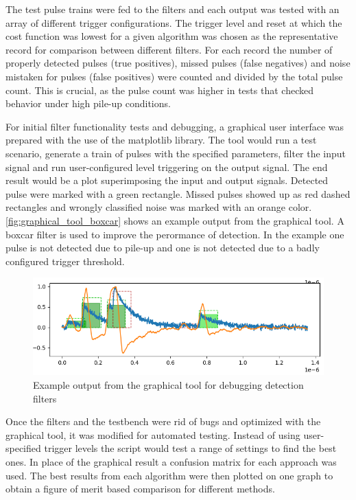 The test pulse trains were fed to the filters and each output was 
tested with an array of different trigger configurations.
The trigger level and reset at which the cost function was lowest for 
a given algorithm was chosen as the representative record for comparison
between different filters.
For each record the number of properly detected pulses (true positives),
missed pulses (false negatives) and noise mistaken for pulses (false positives) 
were counted and divided by the total pulse count.
This is crucial, as the pulse count was higher in tests that checked 
behavior under high pile-up conditions.


For initial filter functionality tests and debugging, a graphical user interface
was prepared with the use of the matplotlib library.
The tool would run a test scenario, generate a train of pulses with 
the specified parameters, filter the input signal and run
user-configured level triggering on the output signal.
The end result would be a plot superimposing the input and output signals.
Detected pulse were marked with a green rectangle. Missed pulses
showed up as red dashed rectangles and wrongly classified noise
was marked with an orange color. \autoref{fig:graphical_tool_boxcar}
shows an example output from the graphical tool. A boxcar filter is used 
to improve the perormance of detection. In the example one pulse
is not detected due to pile-up and one is not detected due
to a badly configured trigger threshold.

\begin{figure}[H]
  \centering
  \includegraphics[width=\linewidth]{media/graphical_tool_boxcar.png}
  \caption{Example output from the graphical tool for debugging detection filters}
  \label{fig:graphical_tool_boxcar} 
\end{figure}

Once the filters and the testbench were rid of bugs and optimized 
with the graphical tool, it was modified for automated testing.
Instead of using user-specified trigger levels the script would 
test a range of settings to find the best ones. In place of the graphical
result a confusion matrix for each approach was used.
The best results from each algorithm were then plotted on
one graph to obtain a figure of merit based comparison for 
different methods.


